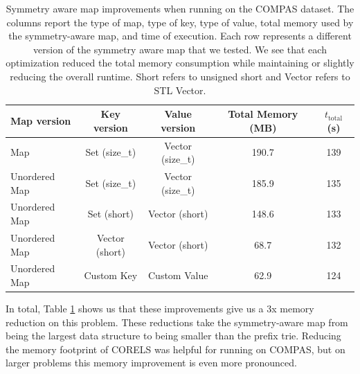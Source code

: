 \begin{table}[t!]
\begin{adjustwidth}{-.4in}{-.4in}
\begin{tabular}{l | c | c | c | c }
Map version & Key version & Value version & Total Memory (MB) & $t_\text{total}$ (s)\\
\hline
Map & Set (size\_t) & Vector (size\_t) & 190.7 & 139 \\
Unordered Map & Set (size\_t) & Vector (size\_t) & 185.9 & 135 \\
Unordered Map & Set  (short) & Vector (short) & 148.6 & 133 \\
Unordered Map & Vector (short) & Vector (short) & 68.7 & 132 \\
Unordered Map & Custom Key & Custom Value & 62.9 & 124 \\
\end{tabular}
\vspace{4mm}
\caption{Symmetry aware map improvements when running on the COMPAS dataset.
%
The columns report the type of map,
type of key, type of value,
total memory used by the symmetry-aware map, and time of execution.
%
Each row represents a different version of the symmetry aware map that we tested.
We see that each optimization reduced the total memory consumption while maintaining or slightly reducing the overall runtime.
Short refers to unsigned short and Vector refers to STL Vector.
}
\label{tab:pmap}
\end{adjustwidth}
\end{table}

In total, Table \ref{tab:pmap} shows us that these improvements give us a 3x memory reduction on this problem.
These reductions take the symmetry-aware map from being the largest data structure to being smaller than the prefix trie.
Reducing the memory footprint of CORELS was helpful for running on COMPAS, but on larger problems this memory improvement is even more pronounced.

